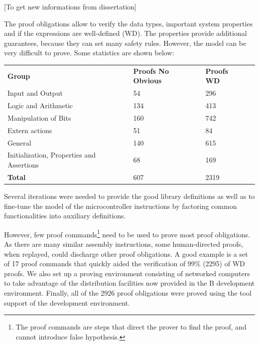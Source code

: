 \documentclass[11pt]{article} %
\begin{document}
[To get new informations from dissertation]

The proof obligations allow to verify the data types, important system
properties and if the expressions are well-defined (WD). The
properties provide additional guarantees, because they can set many
safety rules. However, the model can be very difficult to prove.
Some statistics are shown below:
\begin{center}
\begin{tabular}{llll}
\textbf{Group} &  \textbf{Proofs No Obvious} & \textbf{Proofs WD} &   \\ 
Input and Output & 54 & 296  \\ 
Logic and Arithmetic & 134 & 413  \\ 
Manipulation of Bits & 160 & 742  \\ 
Extern actions & 51 & 84  \\
General & 140 & 615  \\
Initialization, Properties and Assertions & 68 & 169  \\
 \textbf{Total} &  607 &  2319  &  %
\end{tabular}
\end{center}



Several iterations were needed to provide the good library definitions as well as
to fine-tune the model of the microcontroller instructions by factoring common
functionalities into auxiliary definitions.


However, few proof commands\footnote{The proof commands are steps that direct the
prover to find the proof, and cannot introduce false hypothesis.} need to be used
to prove most proof obligations. As there are many similar assembly instructions,
some human-directed proofs, when replayed, could discharge other proof
obligations. A good example is a set of 17 proof commands that quickly aided the
verification of 99\% (2295) of WD proofs. We also set up a proving environment
consisting of networked computers to take advantage of the distribution
facilities now provided in the B development environment. Finally, all of the
2926 proof obligations were proved using the tool support of the development
environment.
\end{document}
